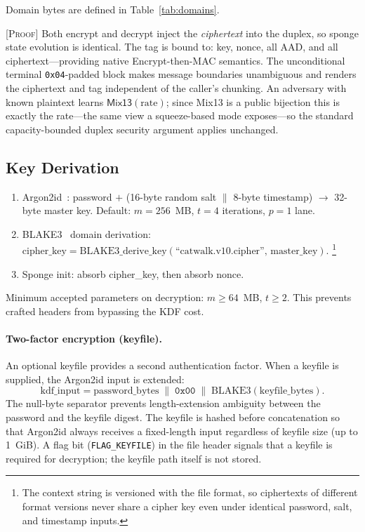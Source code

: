 \documentclass[runningheads]{llncs}
\newcommand{\proof}[1]{\textsc{[Proof]} #1}
\begin{document}
Domain bytes are defined in Table~\ref{tab:domains}.

\proof{Both encrypt and decrypt inject the \emph{ciphertext} into the duplex,
so sponge state evolution is identical.
The tag is bound to: key, nonce, all AAD, and all ciphertext---providing
native Encrypt-then-MAC semantics.  The unconditional terminal
\texttt{0x04}-padded block makes message boundaries unambiguous and renders
the ciphertext and tag independent of the caller's chunking.  An adversary
with known plaintext learns $\mathsf{Mix13}(\mathrm{rate})$; since Mix13 is a
public bijection this is exactly the rate---the same view a squeeze-based
mode exposes---so the standard capacity-bounded duplex security argument
applies unchanged.}

\subsection{Key Derivation}

\begin{enumerate}[nosep]
\item Argon2id~\cite{rfc9106}: password $+$ (16-byte random salt $\|$ 8-byte timestamp)
  $\to$ 32-byte master key.  Default: $m = 256$~MB, $t = 4$ iterations, $p = 1$ lane.
\item BLAKE3~\cite{blake3} domain derivation:
  $\mathrm{cipher\_key} = \mathrm{BLAKE3\_derive\_key}(\text{``catwalk.v10.cipher''},\, \mathrm{master\_key})$.%
  \footnote{The context string is versioned with the file format, so
  ciphertexts of different format versions never share a cipher key even
  under identical password, salt, and timestamp inputs.}
\item Sponge init: absorb cipher\_key, then absorb nonce.
\end{enumerate}

Minimum accepted parameters on decryption: $m \geq 64$~MB, $t \geq 2$.
This prevents crafted headers from bypassing the KDF cost.

\paragraph{Two-factor encryption (keyfile).}
An optional keyfile provides a second authentication factor.  When a keyfile is
supplied, the Argon2id input is extended:
\[
  \mathrm{kdf\_input} = \mathrm{password\_bytes}
    \;\|\; \texttt{0x00}
    \;\|\; \mathrm{BLAKE3}(\mathrm{keyfile\_bytes}).
\]
The null-byte separator prevents length-extension ambiguity between the password
and the keyfile digest.  The keyfile is hashed before concatenation so that
Argon2id always receives a fixed-length input regardless of keyfile size (up to
1~GiB).  A flag bit (\texttt{FLAG\_KEYFILE}) in the file header signals that a
keyfile is required for decryption; the keyfile path itself is not stored.
\end{document}

